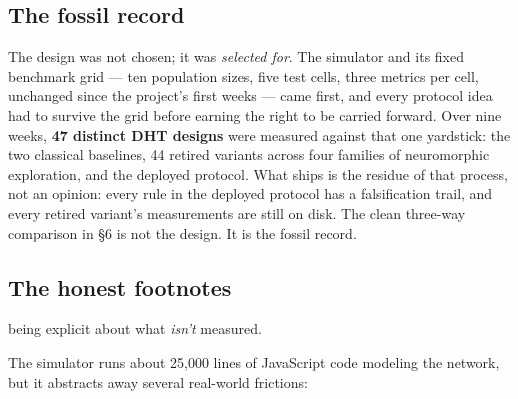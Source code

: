 \documentclass[nobib,justified]{tufte-handout}
\begin{document}
\subsection{The fossil record}

The design was not chosen; it was \emph{selected for}. The simulator and its fixed benchmark grid --- ten population sizes, five test cells, three metrics per cell, unchanged since the project's first weeks --- came first, and every protocol idea had to survive the grid before earning the right to be carried forward. Over nine weeks, \textbf{47 distinct DHT designs} were measured against that one yardstick: the two classical baselines, 44 retired variants across four families of neuromorphic exploration, and the deployed protocol. What ships is the residue of that process, not an opinion: every rule in the deployed protocol has a falsification trail, and every retired variant's measurements are still on disk. The clean three-way comparison in \S6 is not the design. It is the fossil record.

\subsection{The honest footnotes}

 being explicit about what \emph{isn't} measured.

The simulator runs about 25{,}000 lines of JavaScript code modeling the network, but it abstracts away several real-world frictions:
\end{document}
